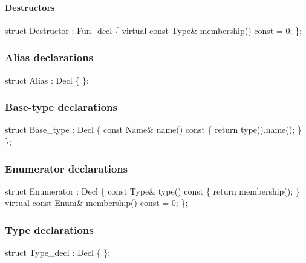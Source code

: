 \documentclass[a4paper,12pt]{article}
\begin{document}
\paragraph{Destructors}

\begin{Program}
   struct Destructor : Fun_decl \{
      virtual const Type& membership() const = 0;
   \};
\end{Program}


\subsubsection{Alias declarations}
\begin{Program}
   struct Alias : Decl \{
   \};
\end{Program}



\subsubsection{Base-type declarations}
\begin{Program}
   struct Base_type : Decl \{
      const Name& name() const \{ return type().name(); \}
   \};
\end{Program}


\subsubsection{Enumerator declarations}

\begin{Program}
   struct Enumerator : Decl \{
      const Type& type() const \{ return membership(); \}
      virtual const Enum& membership() const = 0;
   \};
\end{Program}



\subsubsection{Type declarations}

\begin{Program}
   struct Type_decl : Decl \{
   \};
\end{Program}
\end{document}
